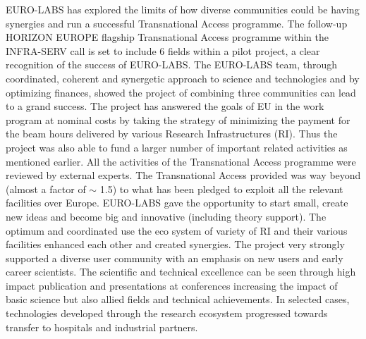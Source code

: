 EURO-LABS has explored the limits of how diverse communities could be having synergies and run a successful Transnational Access programme. The follow-up HORIZON EUROPE flagship Transnational Access programme within the INFRA-SERV call is set to include 6 fields within a pilot project, a clear recognition of the success of EURO-LABS. The EURO-LABS team, through coordinated, coherent and synergetic approach to science and technologies and by optimizing finances, showed the project of combining three communities can lead to a grand success. The project has answered the goals of EU in the work program at nominal costs by taking the strategy of minimizing the payment for the beam hours delivered by various Research Infrastructures (RI). Thus the project was also able to fund a larger number of important related activities as mentioned earlier. All the activities of the Transnational Access programme were reviewed by external experts. The Transnational Access provided was way beyond (almost a factor of $\sim$ 1.5) to what has been pledged to exploit all the relevant facilities over Europe. EURO-LABS gave the opportunity to start small, create new ideas and become big and innovative (including theory support). The optimum and coordinated use the eco system of variety of RI and their various facilities enhanced each other and created synergies. The project very strongly supported a diverse user community with an emphasis on new users and early career scientists. The scientific and technical excellence can be seen through high impact publication and presentations at conferences increasing the impact of basic science but also allied fields and technical achievements. In selected cases, technologies developed through the research ecosystem progressed towards transfer to hospitals and industrial partners.

